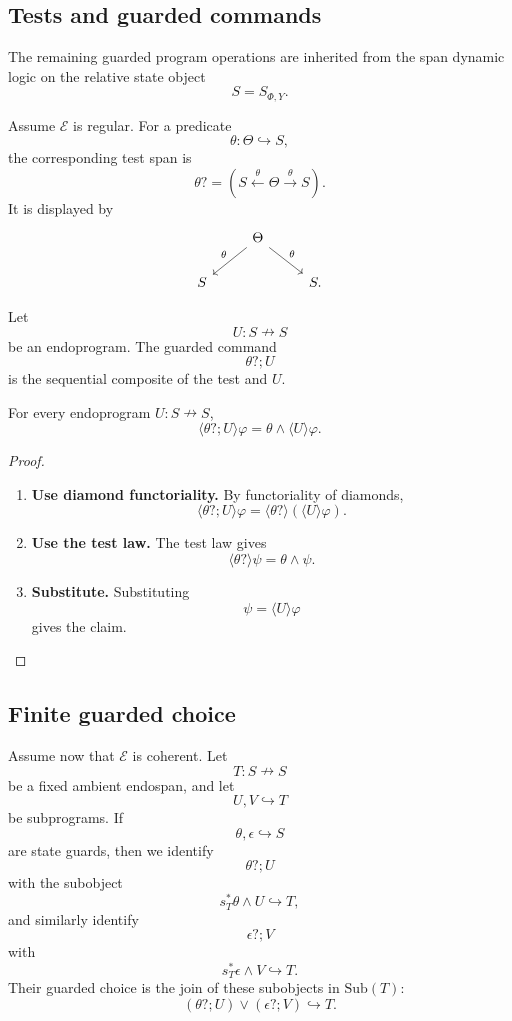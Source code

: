 \subsection{Tests and guarded commands}
\label{subsec:poly-relative-tests-guarded-commands}

The remaining guarded program operations are inherited from the span dynamic
logic on the relative state object
\[
S=S_{\Phi,Y}.
\]

Assume \(\mathcal E\) is regular.  For a predicate
\[
\theta:\Theta\hookrightarrow S,
\]
the corresponding test span is
\[
\theta?
=
(S\xleftarrow{\theta}\Theta\xrightarrow{\theta}S).
\]
It is displayed by
\[
\begin{tikzcd}
&
\Theta
  \arrow[dl,"\theta"']
  \arrow[dr,"\theta"]
&
\\
S && S .
\end{tikzcd}
\]

Let
\[
U:S\nrightarrow S
\]
be an endoprogram.  The guarded command
\[
\theta?;U
\]
is the sequential composite of the test and \(U\).

\begin{proposition}
\label{prop:poly-relative-guard-prefix-law}
For every endoprogram \(U:S\nrightarrow S\),
\[
\langle\theta?;U\rangle\varphi
=
\theta\wedge\langle U\rangle\varphi.
\]
\end{proposition}

\begin{proof}
\leavevmode
\begin{enumerate}
\item \textbf{Use diamond functoriality.}
By functoriality of diamonds,
\[
\langle\theta?;U\rangle\varphi
=
\langle\theta?\rangle(\langle U\rangle\varphi).
\]

\item \textbf{Use the test law.}
The test law gives
\[
\langle\theta?\rangle\psi=\theta\wedge\psi.
\]

\item \textbf{Substitute.}
Substituting
\[
\psi=\langle U\rangle\varphi
\]
gives the claim.
\end{enumerate}
\end{proof}

\subsection{Finite guarded choice}
\label{subsec:poly-relative-finite-guarded-choice}

Assume now that \(\mathcal E\) is coherent.  Let
\[
T:S\nrightarrow S
\]
be a fixed ambient endospan, and let
\[
U,V\hookrightarrow T
\]
be subprograms.  If
\[
\theta,\epsilon\hookrightarrow S
\]
are state guards, then we identify
\[
\theta?;U
\]
with the subobject
\[
s_T^\ast\theta\wedge U\hookrightarrow T,
\]
and similarly identify
\[
\epsilon?;V
\]
with
\[
s_T^\ast\epsilon\wedge V\hookrightarrow T.
\]
Their guarded choice is the join of these subobjects in \(\mathrm{Sub}(T)\):
\[
(\theta?;U)\vee(\epsilon?;V)\hookrightarrow T.
\]

